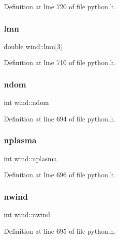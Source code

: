 Definition at line 720 of file python.\+h.

\mbox{\label{structwind_a021e9cbe88f7b0840038d3943f8818d2}} 
\subsubsection{\texorpdfstring{lmn}{lmn}}
{\footnotesize\ttfamily double wind\+::lmn\mbox{[}3\mbox{]}}



Definition at line 710 of file python.\+h.

\mbox{\label{structwind_aaa7f27e1a93690e4c37878a93c40db22}} 
\subsubsection{\texorpdfstring{ndom}{ndom}}
{\footnotesize\ttfamily int wind\+::ndom}



Definition at line 694 of file python.\+h.

\mbox{\label{structwind_ae01b6d799a4f0a60142703606c9fea3c}} 
\subsubsection{\texorpdfstring{nplasma}{nplasma}}
{\footnotesize\ttfamily int wind\+::nplasma}



Definition at line 696 of file python.\+h.

\mbox{\label{structwind_aa879b7be5a0f232f2fde3a95e85824b6}} 
\subsubsection{\texorpdfstring{nwind}{nwind}}
{\footnotesize\ttfamily int wind\+::nwind}



Definition at line 695 of file python.\+h.

\mbox{\label{structwind_a35413d90b5539e3c14b74a7e0fb7dbac}} 
